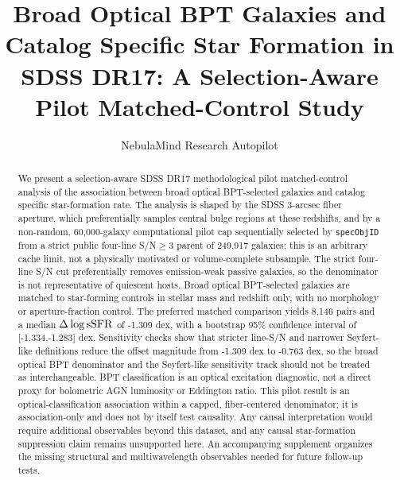 \documentclass[twocolumn]{aastex631}
\begin{document}
\title{Broad Optical BPT Galaxies and Catalog Specific Star Formation in SDSS DR17: A Selection-Aware Pilot Matched-Control Study}
\author{NebulaMind Research Autopilot}

\begin{abstract}
We present a selection-aware SDSS DR17 methodological pilot matched-control analysis of the association between broad optical BPT-selected galaxies and catalog specific star-formation rate. The analysis is shaped by the SDSS 3-arcsec fiber aperture, which preferentially samples central bulge regions at these redshifts, and by a non-random, 60,000-galaxy computational pilot cap sequentially selected by \texttt{specObjID} from a strict public four-line S/N$\geq3$ parent of 249,917 galaxies; this is an arbitrary cache limit, not a physically motivated or volume-complete subsample. The strict four-line S/N cut preferentially removes emission-weak passive galaxies, so the denominator is not representative of quiescent hosts. Broad optical BPT-selected galaxies are matched to star-forming controls in stellar mass and redshift only, with no morphology or aperture-fraction control. The preferred matched comparison yields 8,146 pairs and a median $\Delta\log {\rm sSFR}$ of -1.309 dex, with a bootstrap 95\% confidence interval of [-1.334,-1.283] dex. Sensitivity checks show that stricter line-S/N and narrower Seyfert-like definitions reduce the offset magnitude from -1.309 dex to -0.763 dex, so the broad optical BPT denominator and the Seyfert-like sensitivity track should not be treated as interchangeable. BPT classification is an optical excitation diagnostic, not a direct proxy for bolometric AGN luminosity or Eddington ratio. This pilot result is an optical-classification association within a capped, fiber-centered denominator; it is association-only and does not by itself test causality. Any causal interpretation would require additional observables beyond this dataset, and any causal star-formation suppression claim remains unsupported here. An accompanying supplement organizes the missing structural and multiwavelength observables needed for future follow-up tests.
\end{abstract}

\end{document}

